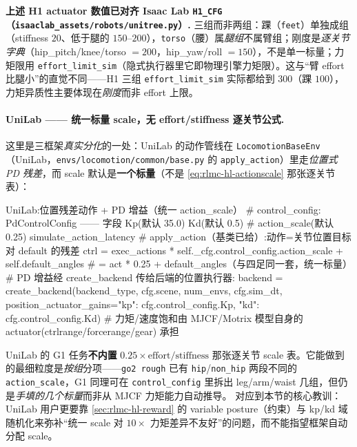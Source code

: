 \begin{note}
\textbf{上述 H1 actuator 数值已对齐 Isaac Lab \texttt{H1\_CFG}（\texttt{isaaclab\_assets/\allowbreak robots/\allowbreak unitree.\allowbreak py}）.}\;
三组而非两组：踝（\texttt{feet}）单独成组（stiffness $20$、低于腿的 $150$--$200$），\texttt{torso}（腰）属\emph{腿组}不属臂组；刚度是\emph{逐关节字典}（hip\_pitch/knee/torso $=200$，hip\_yaw/roll $=150$），不是单一标量；力矩限用 \texttt{effort\_limit\_sim}（隐式执行器里它即物理引擎力矩限）。这与“臂 effort 比腿小”的直觉不同——H1 三组 \texttt{effort\_limit\_sim} 实际都给到 $300$（踝 $100$），力矩异质性主要体现在\emph{刚度}而非 effort 上限。
\end{note}

\paragraph{UniLab —— 统一标量 scale，无 effort/stiffness 逐关节公式.}
这里是三框架\emph{真实分化}的一处：UniLab 的动作管线在 \texttt{LocomotionBaseEnv}（UniLab，\texttt{envs/\allowbreak locomotion/\allowbreak common/\allowbreak base.\allowbreak py} 的 \texttt{apply\_action}）里走\emph{位置式 PD 残差}，而 scale 默认是\textbf{一个标量}（不是 \eqref{eq:rlmc-hl-actionscale} 那张逐关节表）：

\begin{codebox}[Python]{UniLab:位置残差动作 + PD 增益（统一 action\_scale）}
# control_config: PdControlConfig —— 字段 Kp(默认 35.0) Kd(默认 0.5)
#   action_scale(默认 0.25) simulate_action_latency
# apply_action（基类已给）:动作=关节位置目标对 default 的残差
ctrl = exec_actions * self._cfg.control_config.action_scale + self.default_angles
#   = act * 0.25 + default_angles（与四足同一套，统一标量）
# PD 增益经 create_backend 传给后端的位置执行器:
backend = create_backend(backend_type, cfg.scene, num_envs, cfg.sim_dt,
                         position_actuator_gains={"kp": cfg.control_config.Kp,
                                                  "kd": cfg.control_config.Kd})
# 力矩/速度饱和由 MJCF/Motrix 模型自身的 actuator(ctrlrange/forcerange/gear) 承担
\end{codebox}

UniLab 的 G1 任务\textbf{不内置} $0.25\times\text{effort}/\text{stiffness}$ 那张逐关节 scale 表。它能做到的最细粒度是\emph{按组}分项——\texttt{go2 rough} 已有 \texttt{hip}/\allowbreak\texttt{non\_hip} 两段不同的 \texttt{action\_scale}，G1 同理可在 \texttt{control\_config} 里拆出 leg/arm/waist 几组，但仍是\emph{手填的几个标量}而非从 MJCF 力矩能力自动推导。 对应到本节的核心教训：UniLab 用户更要靠 \cref{sec:rlmc-hl-reward} 的 variable posture（约束）与 kp/kd 域随机化来弥补“统一 scale 对 $10\times$ 力矩差异不友好”的问题，而不能指望框架自动分配 scale。

